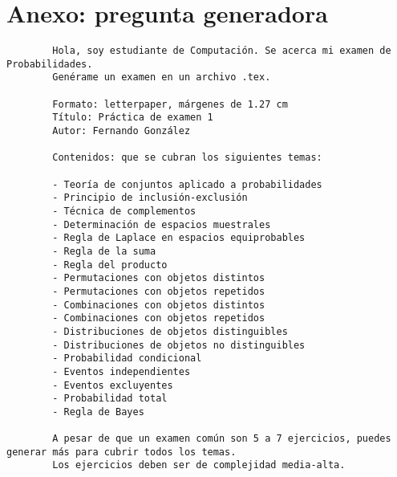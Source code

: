 \documentclass[letterpaper]{article}
\begin{document}
	\section*{Anexo: pregunta generadora}
	\begin{verbatim}
		Hola, soy estudiante de Computación. Se acerca mi examen de Probabilidades.
		Genérame un examen en un archivo .tex.
		
		Formato: letterpaper, márgenes de 1.27 cm
		Título: Práctica de examen 1
		Autor: Fernando González
		
		Contenidos: que se cubran los siguientes temas:
		
		- Teoría de conjuntos aplicado a probabilidades
		- Principio de inclusión-exclusión
		- Técnica de complementos
		- Determinación de espacios muestrales
		- Regla de Laplace en espacios equiprobables
		- Regla de la suma
		- Regla del producto
		- Permutaciones con objetos distintos
		- Permutaciones con objetos repetidos
		- Combinaciones con objetos distintos
		- Combinaciones con objetos repetidos
		- Distribuciones de objetos distinguibles
		- Distribuciones de objetos no distinguibles
		- Probabilidad condicional
		- Eventos independientes
		- Eventos excluyentes
		- Probabilidad total
		- Regla de Bayes
		
		A pesar de que un examen común son 5 a 7 ejercicios, puedes generar más para cubrir todos los temas.
		Los ejercicios deben ser de complejidad media-alta.
	\end{verbatim}
\end{document}
